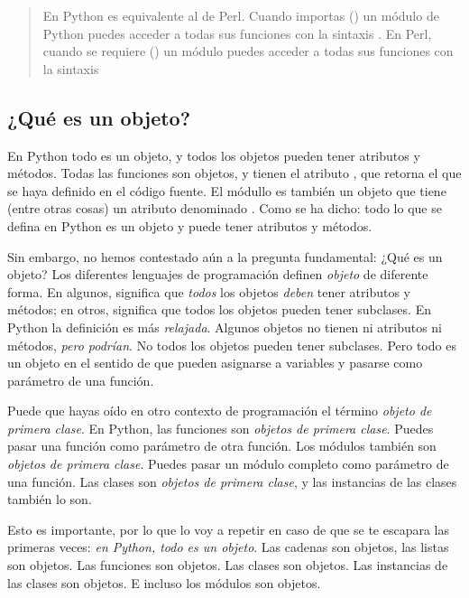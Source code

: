 \begin{quote}
En Python  es equivalente al  de Perl.
Cuando importas () un módulo de Python puedes acceder a todas sus funciones con la sintaxis . En Perl, cuando se requiere () un módulo puedes acceder a todas sus funciones con la sintaxis 
\end{quote}

\subsection{¿Qué es un objeto?}

En Python todo es un objeto, y todos los objetos pueden tener atributos y métodos. Todas las funciones son objetos, y tienen el atributo , que retorna el  que se haya definido en el código fuente. El módullo  es también un objeto que tiene (entre otras cosas) un atributo denominado . Como se ha dicho: todo lo que se defina en Python es un objeto y puede tener atributos y métodos.

Sin embargo, no hemos contestado aún a la pregunta fundamental: ¿Qué es un objeto? Los diferentes lenguajes de programación definen \emph{objeto} de diferente forma. En algunos, significa que \emph{todos} los objetos \emph{deben} tener atributos y métodos; en otros, significa que todos los objetos pueden tener subclases. En Python la definición es más \emph{relajada}. Algunos objetos no tienen ni atributos ni métodos, \emph{pero podrían}. No todos los objetos pueden tener subclases. Pero todo es un objeto en el sentido de que pueden asignarse a variables y pasarse como parámetro de una función.

Puede que hayas oído en otro contexto de programación el término \emph{objeto de primera clase}. En Python, las funciones son \emph{objetos de primera clase}. Puedes pasar una función como parámetro de otra función. Los módulos también son \emph{objetos de primera clase}. Puedes pasar un módulo completo como parámetro de una función. Las clases son \emph{objetos de primera clase}, y las instancias de las clases también lo son.

Esto es importante, por lo que lo voy a repetir en caso de que se te escapara las primeras veces: \emph{en Python, todo es un objeto}. Las cadenas son objetos, las listas son objetos. Las funciones son objetos. Las clases son objetos. Las instancias de las clases son objetos. E incluso los módulos son objetos.

